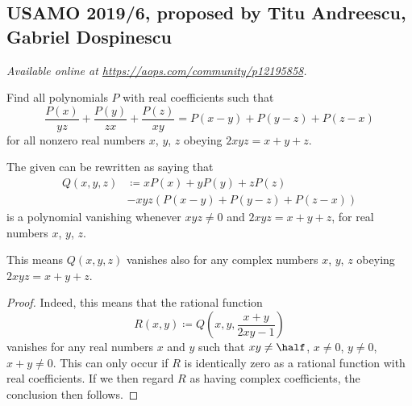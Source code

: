 \documentclass[11pt]{scrartcl}
\begin{document}
\subsection{USAMO 2019/6, proposed by Titu Andreescu, Gabriel Dospinescu}
\textsl{Available online at \url{https://aops.com/community/p12195858}.}
\begin{mdframed}[style=mdpurplebox,frametitle={Problem statement}]
Find all polynomials $P$ with real coefficients such that
\[ \frac{P(x)}{yz} + \frac{P(y)}{zx} + \frac{P(z)}{xy}
  = P(x-y) + P(y-z) + P(z-x) \]
for all nonzero real numbers $x$, $y$, $z$
obeying $2xyz = x+y+z$.
\end{mdframed}
The given can be rewritten as saying that
\begin{align*}
  Q(x,y,z) &\coloneqq xP(x) + yP(y) + zP(z) \\
  &- xyz \left( P(x-y) + P(y-z) + P(z-x) \right)
\end{align*}
is a polynomial vanishing whenever $xyz \neq 0$
and $2xyz = x+y+z$,
for real numbers $x$, $y$, $z$.
\begin{claim*}
  This means $Q(x,y,z)$ vanishes also
  for any complex numbers $x$, $y$, $z$
  obeying $2xyz=x+y+z$.
\end{claim*}
\begin{proof}
  Indeed, this means that the rational function
  \[ R(x,y) \coloneqq Q\left( x,y,\frac{x+y}{2xy-1} \right) \]
  vanishes for any real numbers $x$ and $y$
  such that $xy \neq \half$, $x \neq 0$, $y \neq 0$, $x+y \neq 0$.
  This can only occur if $R$ is identically zero
  as a rational function with real coefficients.
  If we then regard $R$ as having complex coefficients,
  the conclusion then follows.
\end{proof}
\end{document}
